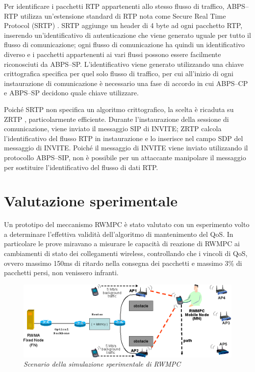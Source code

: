 \documentclass[12pt,a4paper,openright,twoside]{book}
\begin{document}
Per identificare i pacchetti RTP appartenenti allo stesso flusso di
traffico, ABPS--RTP utilizza un'estensione standard di RTP nota come
Secure Real Time Protocol (SRTP) \cite{bib:srtp}. SRTP aggiunge un
header di 4 byte ad ogni pacchetto RTP, inserendo un'identificativo di
autenticazione che viene generato uguale per tutto il flusso di
comunicazione; ogni flusso di comunicazione ha quindi un
identificativo diverso e i pacchetti appartenenti ai vari flussi
possono essere facilmente riconosciuti da ABPS--SP. L'identificativo
viene generato utilizzando una chiave crittografica specifica per quel
solo flusso di traffico, per cui all'inizio di ogni instaurazione di
comunicazione è necessario una fase di accordo in cui ABPS--CP e
ABPS--SP decidono quale chiave utilizzare.

Poiché SRTP non specifica un algoritmo crittografico, la scelta è
ricaduta su ZRTP \cite{bib:zrtp}, particolarmente efficiente. Durante
l'instaurazione della sessione di comunicazione, viene inviato il
messaggio SIP di INVITE; ZRTP calcola l'identificativo del flusso RTP
in instaurazione e lo inserisce nel campo SDP del messaggio di
INVITE. Poiché il messaggio di INVITE viene inviato utilizzando il
protocollo ABPS--SIP, non è possibile per un attaccante manipolare il
messaggio per sostituire l'identificativo del flusso di dati RTP.

\section{Valutazione sperimentale}

Un prototipo del meccanismo RWMPC è stato valutato con un esperimento
volto a determinare l'effettiva validità dell'algoritmo di
mantenimento del QoS. In particolare le prove miravano a misurare le
capacità di reazione di RWMPC ai cambiamenti di stato dei collegamenti
wireless, controllando che i vincoli di QoS, ovvero massimo 150ms di
ritardo nella consegna dei pacchetti e massimo 3\% di pacchetti persi,
non venissero infranti.

\begin{figure}
  \centering
  \includegraphics[width=\textwidth]{img/abps-simulazione}
  \caption{\em Scenario della simulazione sperimentale di RWMPC}
  \label{fig:abps:simulazione}
\end{figure}
\end{document}
